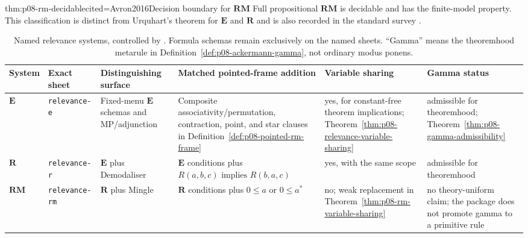 \begin{hbtheorem}{thm:p08-rm-decidable}{cited=Avron2016}{Decision boundary for \(\mathbf{RM}\)}
Full propositional \(\mathbf{RM}\) is decidable and has the finite-model
property.  This classification is distinct from Urquhart's theorem for
\(\mathbf E\) and \(\mathbf R\) and is also recorded in the standard survey
\cite{DunnRestall2002}.
\end{hbtheorem}

\begin{table}[!htbp]
\centering
\begingroup\scriptsize
\setlength{\tabcolsep}{3pt}
\begin{tabular}{@{}p{}p{}p{}
  p{}p{}p{}@{}}
\toprule
System & Exact sheet & Distinguishing surface & Matched pointed-frame addition
& Variable sharing & Gamma status \\
\midrule
\(\mathbf E\) & \texttt{relevance-e} & Fixed-menu \(\mathbf E\) schemas and
MP/adjunction & Composite associativity/permutation, contraction, point, and
star clauses in Definition~\ref{def:p08-pointed-rm-frame} & yes, for
constant-free theorem implications; Theorem~\ref{thm:p08-relevance-variable-sharing}
& admissible for theoremhood; Theorem~\ref{thm:p08-gamma-admissibility} \\
\(\mathbf R\) & \texttt{relevance-r} & \(\mathbf E\) plus Demodaliser & \(\mathbf E\) conditions plus
  \(R(a,b,c)\text{ implies }R(b,a,c)\) & yes, with the same scope & admissible for
theoremhood \\
\(\mathbf{RM}\) & \texttt{relevance-rm} & \(\mathbf R\) plus Mingle & \(\mathbf R\) conditions plus
\(0\leq a\) or \(0\leq a^*\) & no; weak replacement in
Theorem~\ref{thm:p08-rm-variable-sharing} & no theory-uniform claim; the
package does not promote gamma to a primitive rule \\
\bottomrule
\end{tabular}
\endgroup
\caption{Named relevance systems, controlled by
\cite{AndersonBelnap1975,MeyerDunn1969,RoutleyMeyer1973,DunnRestall2002}.
Formula schemas remain exclusively on the named sheets.  ``Gamma'' means the
theoremhood metarule in Definition~\ref{def:p08-ackermann-gamma}, not ordinary
modus ponens.}
\label{tab:p08-relevance-systems}
\end{table}

